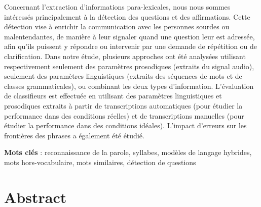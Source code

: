 \documentclass{style/these}
\makeatletter
\newcommand\blankpage{%
    \null
    \thispagestyle{empty}%
    \addtocounter{page}{-1}%
    \newpage}
\renewcommand*{\cleardoublepage}{\clearpage\if@twoside \ifodd\c@page\else
	\hbox{}%
	\thispagestyle{empty}%
	\newpage%
	\if@twocolumn\hbox{}\newpage\fi\fi\fi}
\makeatother
\begin{document}
{Concernant l'extraction d'informations para-lexicales, nous nous sommes intéressés principalement à la détection des questions et des affirmations. Cette détection vise à enrichir la communication avec les personnes sourdes ou malentendantes, de manière à leur signaler quand une question leur est adressée, afin qu'ils puissent y répondre ou intervenir par une demande de répétition ou de clarification. 
Dans notre étude, plusieurs approches ont été analysées utilisant respectivement seulement des paramètres prosodiques (extraits du signal audio), seulement des paramètres linguistiques (extraits des séquences de mots et de classes grammaticales), ou combinant les deux types d'information. 
L'évaluation de classifieurs est effectuée en utilisant des paramètres linguistiques et prosodiques extraits à partir de transcriptions automatiques (pour étudier la performance dans
des conditions réelles) et de transcriptions manuelles (pour étudier la performance dans des conditions idéales). 
L'impact d'erreurs sur les frontières des phrases a également été étudié. 
}

\vspace{1.5ex}

\noindent\textbf{Mots clés} : reconnaissance de la parole, syllabes, modèles de langage hybrides, mots hors-vocabulaire,  mots similaires, détection de questions


\cleardoublepage


\section*{Abstract}

\vspace{0.5ex}
\end{document}
